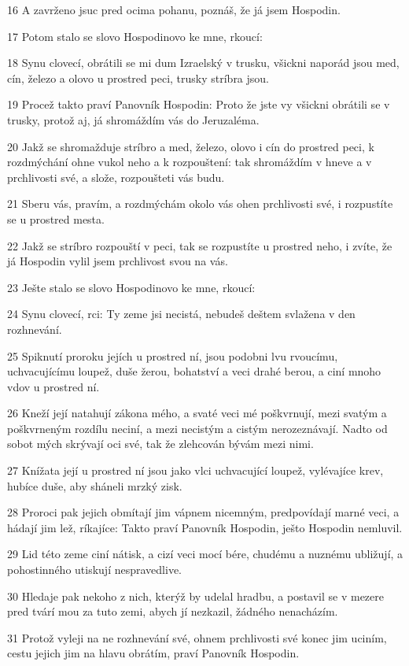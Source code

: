 \par 16 A zavrženo jsuc pred ocima pohanu, poznáš, že já jsem Hospodin.
\par 17 Potom stalo se slovo Hospodinovo ke mne, rkoucí:
\par 18 Synu clovecí, obrátili se mi dum Izraelský v trusku, všickni naporád jsou med, cín, železo a olovo u prostred peci, trusky stríbra jsou.
\par 19 Procež takto praví Panovník Hospodin: Proto že jste vy všickni obrátili se v trusky, protož aj, já shromáždím vás do Jeruzaléma.
\par 20 Jakž se shromažduje stríbro a med, železo, olovo i cín do prostred peci, k rozdmýchání ohne vukol neho a k rozpouštení: tak shromáždím v hneve a v prchlivosti své, a slože, rozpoušteti vás budu.
\par 21 Sberu vás, pravím, a rozdmýchám okolo vás ohen prchlivosti své, i rozpustíte se u prostred mesta.
\par 22 Jakž se stríbro rozpouští v peci, tak se rozpustíte u prostred neho, i zvíte, že já Hospodin vylil jsem prchlivost svou na vás.
\par 23 Ješte stalo se slovo Hospodinovo ke mne, rkoucí:
\par 24 Synu clovecí, rci: Ty zeme jsi necistá, nebudeš deštem svlažena v den rozhnevání.
\par 25 Spiknutí proroku jejích u prostred ní, jsou podobni lvu rvoucímu, uchvacujícímu loupež, duše žerou, bohatství a veci drahé berou, a ciní mnoho vdov u prostred ní.
\par 26 Kneží její natahují zákona mého, a svaté veci mé poškvrnují, mezi svatým a poškvrneným rozdílu neciní, a mezi necistým a cistým nerozeznávají. Nadto od sobot mých skrývají oci své, tak že zlehcován bývám mezi nimi.
\par 27 Knížata její u prostred ní jsou jako vlci uchvacující loupež, vylévajíce krev, hubíce duše, aby sháneli mrzký zisk.
\par 28 Proroci pak jejich obmítají jim vápnem nicemným, predpovídají marné veci, a hádají jim lež, ríkajíce: Takto praví Panovník Hospodin, ješto Hospodin nemluvil.
\par 29 Lid této zeme ciní nátisk, a cizí veci mocí bére, chudému a nuznému ubližují, a pohostinného utiskují nespravedlive.
\par 30 Hledaje pak nekoho z nich, kterýž by udelal hradbu, a postavil se v mezere pred tvárí mou za tuto zemi, abych jí nezkazil, žádného nenacházím.
\par 31 Protož vyleji na ne rozhnevání své, ohnem prchlivosti své konec jim uciním, cestu jejich jim na hlavu obrátím, praví Panovník Hospodin.

